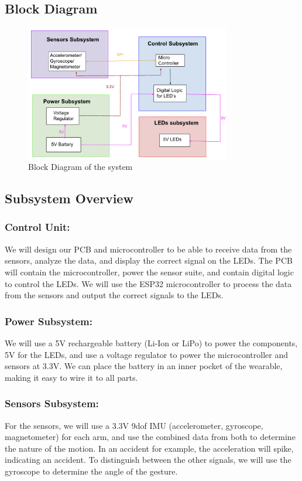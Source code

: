 \documentclass[12pt]{article}
\begin{document}
\subsection{Block Diagram}
\begin{figure}[ht]
    \centering
    \includegraphics[width=0.8\textwidth]{block_diagram.png}
    \caption{Block Diagram of the system}
    \label{fig:my_label1}
\end{figure}
\subsection{Subsystem Overview}
    \subsubsection{Control Unit:} 
    We will design our PCB and microcontroller to be able to 
    receive data from the sensors, analyze the data, and display 
    the correct signal on the LEDs. The PCB will contain the 
    microcontroller, power the sensor suite, and contain digital 
    logic to control the LEDs. We will use the ESP32 microcontroller 
    to process the data from the sensors and output the correct 
    signals to the LEDs.
    \subsubsection{Power Subsystem:} 
	We will use a 5V rechargeable battery (Li-Ion or LiPo) to 
    power the components, 5V for the LEDs, and use a voltage 
    regulator to power the microcontroller and sensors at 3.3V. 
    We can place the battery in an inner pocket of the wearable,
     making it easy to wire it to all parts.
    \subsubsection{Sensors Subsystem:} 
    For the sensors, we will use a 3.3V 9dof IMU (accelerometer, 
    gyroscope, magnetometer) for each arm, and use the combined 
    data from both to determine the nature of the motion. In an 
    accident for example, the acceleration will spike, indicating 
    an accident. To distinguish between the other signals, we will
     use the gyroscope to determine the angle of the gesture. 
\end{document}
